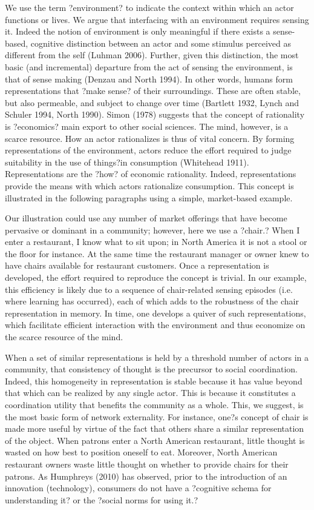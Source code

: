 We use the term ?environment? to indicate the context within which an actor functions or lives. We argue that interfacing with an environment requires sensing it. Indeed the notion of environment is only meaningful if there exists a sense-based, cognitive distinction between an actor and some stimulus perceived as different from the self (Luhman 2006). Further, given this distinction, the most basic (and incremental) departure from the act of sensing the environment, is that of sense making (Denzau and North 1994). In other words, humans form representations that ?make sense? of their surroundings. These are often stable, but also permeable, and subject to change over time (Bartlett 1932, Lynch and Schuler 1994, North 1990).
Simon (1978) suggests that the concept of rationality is ?economics? main export to other social sciences. The mind, however, is a scarce resource. How an actor rationalizes is thus of vital concern. By forming representations of the environment, actors reduce the effort required to judge suitability in the use of things?in consumption (Whitehead 1911). Representations are the ?how? of economic rationality. Indeed, representations provide the means with which actors rationalize consumption. This concept is illustrated in the following paragraphs using a simple, market-based example. 

Our illustration could use any number of market offerings that have become pervasive or dominant in a community; however, here we use a ?chair.? When I enter a restaurant, I know what to sit upon; in North America it is not a stool or the floor for instance. At the same time the restaurant manager or owner knew to have chairs available for restaurant customers. Once a representation is developed, the effort required to reproduce the concept is trivial. In our example, this efficiency is likely due to a sequence of chair-related sensing episodes (i.e. where learning has occurred), each of which adds to the robustness of the chair representation in memory. In time, one develops a quiver of such representations, which facilitate efficient interaction with the environment  and thus economize on the scarce resource of the mind. 

When a set of similar representations is held by a threshold number of actors in a community, that consistency of thought is the precursor to social coordination. Indeed, this homogeneity in representation is stable because it has value beyond that which can be realized by any single actor. This is because it constitutes a coordination utility that benefits the community as a whole. This, we suggest, is the most basic form of network externality. For instance, one?s concept of chair is made more useful by virtue of the fact that others share a similar representation of the object. When patrons enter a North American restaurant, little thought is wasted on how best to position oneself to eat. Moreover, North American restaurant owners waste little thought on whether to provide chairs for their patrons. As Humphreys (2010) has observed, prior to the introduction of an innovation (technology), consumers do not have a ?cognitive schema for understanding it? or the ?social norms for using it.?  

